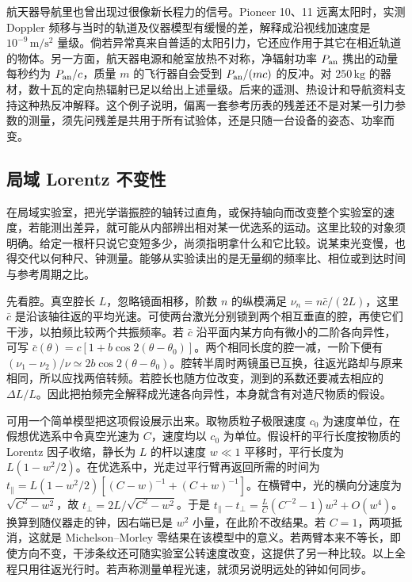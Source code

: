 航天器导航里也曾出现过很像新长程力的信号。Pioneer 10、11 远离太阳时，实测 Doppler 频移与当时的轨道及仪器模型有缓慢的差，解释成沿视线加速度是 $10^{-9}\,\mathrm{m/s^2}$ 量级。倘若异常真来自普适的太阳引力，它还应作用于其它在相近轨道的物体。另一方面，航天器电源和舱室放热不对称，净辐射功率 $P_{\rm an}$ 携出的动量每秒约为 $P_{\rm an}/c$，质量 $m$ 的飞行器自会受到 $P_{\rm an}/(mc)$ 的反冲。对 $250\,\mathrm{kg}$ 的器材，数十瓦的定向热辐射已足以给出上述量级。后来的遥测、热设计和导航资料支持这种热反冲解释。这个例子说明，偏离一套参考历表的残差还不是对某一引力参数的测量，须先问残差是共用于所有试验体，还是只随一台设备的姿态、功率而变。

\subsection{局域 Lorentz 不变性}

在局域实验室，把光学谐振腔的轴转过直角，或保持轴向而改变整个实验室的速度，若能测出差异，就可能从内部辨出相对某一优选系的运动。这里比较的对象须明确。给定一根杆只说它变短多少，尚须指明拿什么和它比较。说某束光变慢，也得交代以何种尺、钟测量。能够从实验读出的是无量纲的频率比、相位或到达时间与参考周期之比。

先看腔。真空腔长 $L$，忽略镜面相移，阶数 $n$ 的纵模满足 $\nu_n=n\bar c/(2L)$，这里 $\bar c$ 是沿该轴往返的平均光速。可使两台激光分别锁到两个相互垂直的腔，再使它们干涉，以拍频比较两个共振频率。若 $\bar c$ 沿平面内某方向有微小的二阶各向异性，可写 $\bar c(\theta)=c[1+b\cos 2(\theta-\theta_0)]$。两个相同长度的腔一减，一阶下便有 $(\nu_1-\nu_2)/\nu\simeq2b\cos2(\theta-\theta_0)$。腔转半周时两镜虽已互换，往返光路却与原来相同，所以应找两倍转频。若腔长也随方位改变，测到的系数还要减去相应的 $\Delta L/L$。因此把拍频完全解释成光速各向异性，本身就含有对造尺物质的假设。

可用一个简单模型把这项假设展示出来。取物质粒子极限速度 $c_0$ 为速度单位，在假想优选系中令真空光速为 $C$，速度均以 $c_0$ 为单位。假设杆的平行长度按物质的 Lorentz 因子收缩，静长为 $L$ 的杆以速度 $w\ll1$ 平移时，平行长度为 $L(1-w^2/2)$。在优选系中，光走过平行臂再返回所需的时间为 $t_\parallel=L(1-w^2/2)[(C-w)^{-1}+(C+w)^{-1}]$。在横臂中，光的横向分速度为 $\sqrt{C^2-w^2}$，故 $t_\perp=2L/\sqrt{C^2-w^2}$。于是 $t_\parallel-t_\perp= \frac{L}{C}(C^{-2}-1)w^2+O(w^4)$。换算到随仪器走的钟，因右端已是 $w^2$ 小量，在此阶不改结果。若 $C=1$，两项抵消，这就是 Michelson--Morley 零结果在该模型中的意义。若两臂本来不等长，即使方向不变，干涉条纹还可随实验室公转速度改变，这提供了另一种比较。以上全程只用往返光行时。若声称测量单程光速，就须另说明远处的钟如何同步。

